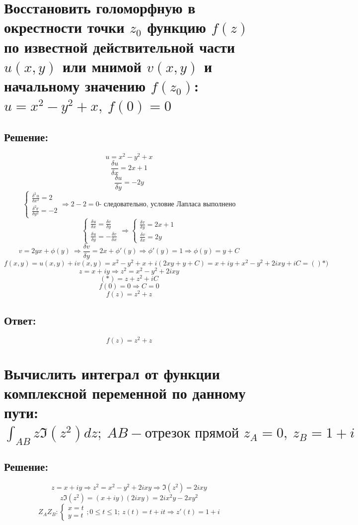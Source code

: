 \documentclass{article}
\begin{document}
	
	
	\section{Восстановить голоморфную в окрестности точки $z_0$ функцию $f(z)$ по известной действительной части $u(x,y)$ или мнимой $v(x,y)$ и начальному значению $f(z_0)$: $u = x^2 - y^2 + x, \ f(0) = 0$}
	\subsection{Решение:}
	\[u = x^2 - y^2 + x\]
	\[\frac{\delta u}{\delta x} = 2x+1\]
	\[\frac{\delta u}{\delta y} = -2y\]
	\[\begin{cases}
		\frac{\delta^2 u}{\delta x ^2} = 2\\
		\frac{\delta ^ 2 г}{\delta y^2} = -2
	\end{cases} \Rightarrow 2 -2 = 0 \text{- следовательно, условие Лапласа выполнено}\]
	\[\begin{cases}
		\frac{\delta u }{\delta x} = \frac{\delta v}{\delta y} \\
		\frac{\delta u} {\delta y} = - \frac{\delta v}{\delta x}
	\end{cases} \Rightarrow
	\begin{cases}
		\frac{\delta v}{\delta y} = 2x+1 \\
		\frac{\delta v}{\delta x} = 2y
	\end{cases}\]
	\[v = 2yx + \phi (y) \ \Rightarrow \frac{\delta v}{\delta y} =2x + \phi'(y) \Rightarrow \phi' (y) = 1 \Rightarrow \phi(y) = y+C\]
	\[f(x,y) = u(x,y) + iv(x,y) = x^2 - y^2 +x + i (2xy + y + C)  = x + iy + x^2 - y^2 + 2ixy + iC =()*)\]
	\[z = x + iy \Rightarrow z ^2 = x^2 - y^2 +2ixy\]
	\[(*) = z + z^2 + iC\]
	\[f(0) = 0 \Rightarrow C = 0\]
	\[f(z) = z^2 + z\]
	\subsection{Ответ:}
	\[f(z) = z^2 + z\]
	
	\section{Вычислить интеграл от функции комплексной переменной по данному пути: $\int_{AB} z \Im(z^2) dz; \ AB - \text{отрезок прямой } z_A = 0, \ z_B = 1 + i$}
	\subsection{Решение:}
	\[z= x +iy \Rightarrow z ^2 = x^2 - y^2 + 2ixy \Rightarrow \Im(z^2) = 2ixy\]
	\[z\Im (z^2) = (x+iy)(2ixy) = 2ix^2y - 2xy^2\]
	\[Z_AZ_B: \begin{cases}
		x =t \\ y = t
	\end{cases}; 0 \le t \le 1; \ z(t) = t + it \Rightarrow z'(t) = 1 + i\]
	
\end{document}
